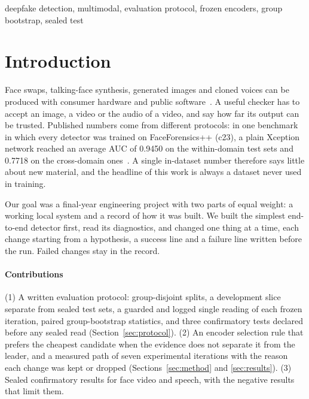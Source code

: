 \documentclass[conference,a4paper]{IEEEtran_nodash}
\begin{document}
\begin{IEEEkeywords}
deepfake detection, multimodal, evaluation protocol, frozen encoders, group
bootstrap, sealed test
\end{IEEEkeywords}

\section{Introduction}\label{sec:intro}

Face swaps, talking-face synthesis, generated images and cloned voices can be
produced with consumer hardware and public software~\cite{dolhansky2020dfdc}. A
useful checker has to accept an image, a video or the audio of a video, and say
how far its output can be trusted. Published numbers come from different
protocols: in one benchmark in which every detector was trained on
FaceForensics++ (c23), a plain Xception network reached an average AUC of 0.9450
on the within-domain test sets and 0.7718 on the cross-domain
ones~\cite{yan2023deepfakebench}. %
A single in-dataset number therefore says little about new material, and the
headline of this work is always a dataset never used in training.

Our goal was a final-year engineering project with two parts of equal weight: a
working local system and a record of how it was built. We built the simplest
end-to-end detector first, read its diagnostics, and changed one thing at a time,
each change starting from a hypothesis, a success line and a failure line written
before the run. Failed changes stay in the record.

\paragraph*{Contributions}
(1) A written evaluation protocol: group-disjoint splits, a development slice
separate from sealed test sets, a guarded and logged single reading of each
frozen iteration, paired group-bootstrap statistics, and three confirmatory tests
declared before any sealed read (Section~\ref{sec:protocol}). (2) An encoder
selection rule that prefers the cheapest candidate when the evidence does not
separate it from the leader, and a measured path of seven experimental iterations
with the reason each change was kept or dropped (Sections~\ref{sec:method} and
\ref{sec:results}). (3) Sealed confirmatory results for face video and speech,
with the negative results that limit them.
\end{document}
